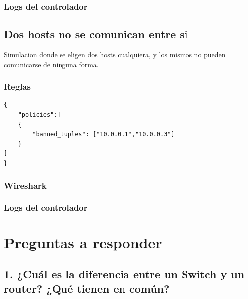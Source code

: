 \documentclass{article}
\begin{document}
\subsubsection{Logs del controlador}
\begin{center}
\end{center}

\subsection{Dos hosts no se comunican entre si}
Simulacion donde se eligen dos hosts cualquiera, y los mismos no pueden comunicarse de ninguna forma.

\subsubsection{Reglas}

\begin{verbatim}
{
    "policies":[
    {
        "banned_tuples": ["10.0.0.1","10.0.0.3"]
    }
]
}
\end{verbatim}


\subsubsection{Wireshark}
\begin{center}
\end{center}

\subsubsection{Logs del controlador}
\begin{center}
\end{center}

\newpage
\section{\texorpdfstring{\textbf{Preguntas a responder}}{Preguntas a responder}}\label{preguntas-a-responder}

\subsection{1. ¿Cuál es la diferencia entre un Switch y un router? ¿Qué tienen en común?}\label{describa-la-arquitectura-cliente-servidor.}
\end{document}
